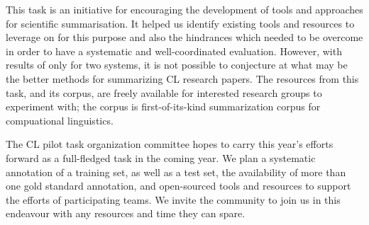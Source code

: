 \documentclass[11pt]{article}
\begin{document}
This task is an initiative for encouraging the development of tools and 
approaches for scientific summarisation. It helped us identify 
existing tools and resources to leverage on for this purpose
and also the hindrances which needed to be overcome in order to have a 
systematic and well-coordinated evaluation. However, with results of 
only for two systems, it is not possible to conjecture at what may be the 
better methods for summarizing CL research papers. The 
resources from this task, and its corpus, are freely available 
for interested research groups to experiment with; the corpus is 
first-of-its-kind summarization corpus for compuational linguistics.

The CL pilot task organization committee hopes to carry this year's efforts 
forward as a full-fledged task in the coming year. We plan a systematic 
annotation of a training set, as well as a test set, the availability of 
more than one gold standard annotation, and open-sourced tools and 
resources to support the efforts of participating teams. We invite the 
community to join us in this endeavour with any resources and time they 
can spare.



\end{document}
